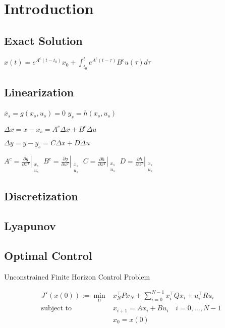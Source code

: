 \section{Introduction}

\subsection{Exact  Solution}

$x(t) = e^{A^c(t-t_0)}x_0 +
	\textstyle\int_{t_0}^{t}e^{A^c(t-\tau)}B^c u(\tau)d\tau$


\subsection{Linearization}

$\dot{x_s}=g(x_s,u_s) = 0$
$y_s= h(x_s,u_s)$

$\Delta \dot{x} =\dot{x} -\dot{x_s} = A^c\Delta x + B^c\Delta u$

$\Delta y = y - y_s  = C\Delta x + D\Delta u $

$A^c= \left.\frac{\partial g}{\partial x^T}\right|_{\substack{x_s \\u_s}} $
$B^c= \left.\frac{\partial g}{\partial u^T}\right|_{\substack{x_s \\u_s}} $
$C= \left.\frac{\partial h}{\partial x^T}\right|_{\substack{x_s \\u_s}} $
$D= \left.\frac{\partial h}{\partial u^T}\right|_{\substack{x_s \\u_s}} $

\subsection{Discretization}
%

\subsection{Lyapunov}

\subsection{Optimal Control}

Unconstrained Finite Horizon Control Problem

$$\begin{aligned}
		J^\star(x(0)) :=
		\min_U & x_N^\top P x_N +
		\textstyle\sum_{i=0}^{N-1}
		x_i^\top Q x_i + u_i^\top R u_i
		\\
		\text{subject to  }
		       & x_{i+1}                = Ax_i+Bu_i
		\quad i  = 0,\dots,N-1                      \\
		       & x_0                    = x(0)
	\end{aligned}$$

